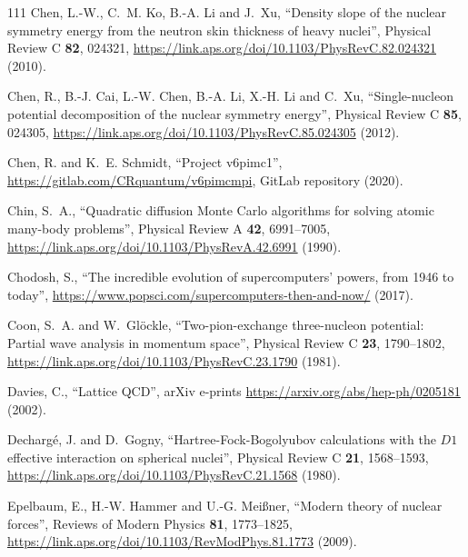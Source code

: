 \documentclass[12pt,letterpaper,UTF8]{report}
\begin{document}
{\begin{thebibliography}{111}
Chen, L.-W., C.~M. Ko, B.-A. Li and J.~Xu, \enquote{Density slope of the
  nuclear symmetry energy from the neutron skin thickness of heavy nuclei},
  Physical Review C \textbf{82}, 024321,
  \urlprefix\url{https://link.aps.org/doi/10.1103/PhysRevC.82.024321} (2010).

Chen, R., B.-J. Cai, L.-W. Chen, B.-A. Li, X.-H. Li and C.~Xu,
  \enquote{Single-nucleon potential decomposition of the nuclear symmetry
  energy}, Physical Review C \textbf{85}, 024305,
  \urlprefix\url{https://link.aps.org/doi/10.1103/PhysRevC.85.024305} (2012).

Chen, R. and K.~E. Schmidt, \enquote{Project v6pimc1},
  \url{https://gitlab.com/CRquantum/v6pimcmpi}, {GitLab repository} (2020).

Chin, S.~A., \enquote{Quadratic diffusion {Monte} {Carlo} algorithms for
  solving atomic many-body problems}, Physical Review A \textbf{42},
  6991--7005, \urlprefix\url{https://link.aps.org/doi/10.1103/PhysRevA.42.6991}
  (1990).

Chodosh, S., \enquote{The incredible evolution of supercomputers' powers, from
  1946 to today},
  \urlprefix\url{https://www.popsci.com/supercomputers-then-and-now/} (2017).

Coon, S.~A. and W.~Gl\"ockle, \enquote{Two-pion-exchange three-nucleon
  potential: Partial wave analysis in momentum space}, Physical Review C
  \textbf{23}, 1790--1802,
  \urlprefix\url{https://link.aps.org/doi/10.1103/PhysRevC.23.1790} (1981).

Davies, C., \enquote{{Lattice QCD}}, arXiv e-prints
  \urlprefix\url{https://arxiv.org/abs/hep-ph/0205181} (2002).

Decharg\'e, J. and D.~Gogny, \enquote{{Hartree}-{Fock}-{Bogolyubov}
  calculations with the {$D1$} effective interaction on spherical nuclei},
  Physical Review C \textbf{21}, 1568--1593,
  \urlprefix\url{https://link.aps.org/doi/10.1103/PhysRevC.21.1568} (1980).

Epelbaum, E., H.-W. Hammer and U.-G. Mei\ss{}ner, \enquote{Modern theory of
  nuclear forces}, Reviews of Modern Physics \textbf{81}, 1773--1825,
  \urlprefix\url{https://link.aps.org/doi/10.1103/RevModPhys.81.1773} (2009).


\end{thebibliography}}
\end{document}

